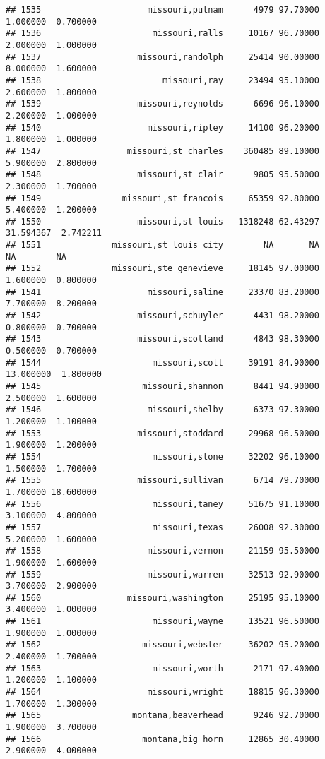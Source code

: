 \documentclass[
]{article}
\begin{document}
\begin{verbatim}
## 1535                     missouri,putnam      4979 97.70000  1.000000  0.700000
## 1536                      missouri,ralls     10167 96.70000  2.000000  1.000000
## 1537                   missouri,randolph     25414 90.00000  8.000000  1.600000
## 1538                        missouri,ray     23494 95.10000  2.600000  1.800000
## 1539                   missouri,reynolds      6696 96.10000  2.200000  1.000000
## 1540                     missouri,ripley     14100 96.20000  1.800000  1.000000
## 1547                 missouri,st charles    360485 89.10000  5.900000  2.800000
## 1548                   missouri,st clair      9805 95.50000  2.300000  1.700000
## 1549                missouri,st francois     65359 92.80000  5.400000  1.200000
## 1550                   missouri,st louis   1318248 62.43297 31.594367  2.742211
## 1551              missouri,st louis city        NA       NA        NA        NA
## 1552              missouri,ste genevieve     18145 97.00000  1.600000  0.800000
## 1541                     missouri,saline     23370 83.20000  7.700000  8.200000
## 1542                   missouri,schuyler      4431 98.20000  0.800000  0.700000
## 1543                   missouri,scotland      4843 98.30000  0.500000  0.700000
## 1544                      missouri,scott     39191 84.90000 13.000000  1.800000
## 1545                    missouri,shannon      8441 94.90000  2.500000  1.600000
## 1546                     missouri,shelby      6373 97.30000  1.200000  1.100000
## 1553                   missouri,stoddard     29968 96.50000  1.900000  1.200000
## 1554                      missouri,stone     32202 96.10000  1.500000  1.700000
## 1555                   missouri,sullivan      6714 79.70000  1.700000 18.600000
## 1556                      missouri,taney     51675 91.10000  3.100000  4.800000
## 1557                      missouri,texas     26008 92.30000  5.200000  1.600000
## 1558                     missouri,vernon     21159 95.50000  1.900000  1.600000
## 1559                     missouri,warren     32513 92.90000  3.700000  2.900000
## 1560                 missouri,washington     25195 95.10000  3.400000  1.000000
## 1561                      missouri,wayne     13521 96.50000  1.900000  1.000000
## 1562                    missouri,webster     36202 95.20000  2.400000  1.700000
## 1563                      missouri,worth      2171 97.40000  1.200000  1.100000
## 1564                     missouri,wright     18815 96.30000  1.700000  1.300000
## 1565                  montana,beaverhead      9246 92.70000  1.900000  3.700000
## 1566                    montana,big horn     12865 30.40000  2.900000  4.000000

\end{verbatim}
\end{document}
